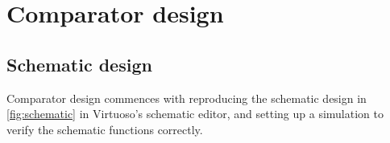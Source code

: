 \clearpage
\section{Comparator design}
\subsection{Schematic design}
Comparator design commences with reproducing the schematic design in \cref{fig:schematic} in Virtuoso's schematic editor,
and setting up a simulation to verify the schematic functions correctly. 
